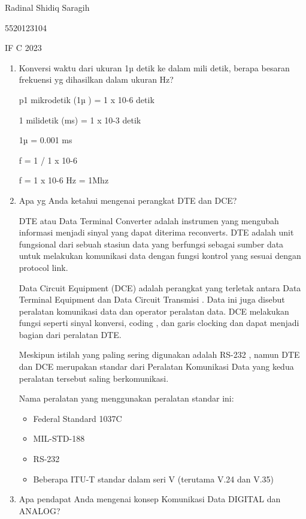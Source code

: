 \documentclass[12pt,a4paper]{article}
\date{}
\begin{document}
Radinal Shidiq Saragih

5520123104

IF C 2023

\begin{enumerate}

  \item Konversi waktu dari ukuran 1µ detik ke dalam mili detik, berapa besaran frekuensi yg dihasilkan dalam ukuran Hz?

    p1 mikrodetik (1µ ) = 1 x 10-6  detik

    1 milidetik (ms) = 1 x 10-3 detik

    1µ = 0.001 ms

    f = 1 / 1 x 10-6  

    f = 1 x 10-6  Hz = 1Mhz

  \item Apa yg Anda ketahui mengenai perangkat DTE dan DCE?

  DTE atau Data Terminal Converter adalah instrumen yang mengubah informasi
  menjadi sinyal yang dapat diterima reconverts. DTE adalah unit fungsional
  dari sebuah stasiun data yang berfungsi sebagai sumber data untuk 
  melakukan komunikasi data dengan fungsi kontrol yang sesuai dengan
  protocol link.

   Data Circuit Equipment (DCE) adalah perangkat yang terletak antara Data
   Terminal Equipment dan Data Circuit Transmisi . Data ini juga disebut 
   peralatan komunikasi data dan operator peralatan data. DCE melakukan fungsi
   seperti sinyal konversi, coding , dan garis clocking dan dapat menjadi bagian
   dari peralatan DTE. 

  Meskipun istilah yang paling sering digunakan adalah RS-232 , namun DTE dan
  DCE merupakan standar dari Peralatan Komunikasi Data yang kedua peralatan
  tersebut saling berkomunikasi. 

    Nama peralatan yang menggunakan peralatan standar ini:

    \begin{itemize}
      \item Federal Standard 1037C
      \item MIL-STD-188
      \item RS-232
      \item Beberapa ITU-T standar dalam seri V (terutama V.24 dan V.35) 
    \end{itemize}


  \item Apa pendapat Anda mengenai konsep Komunikasi Data DIGITAL dan ANALOG?


\end{enumerate}
\end{document}
